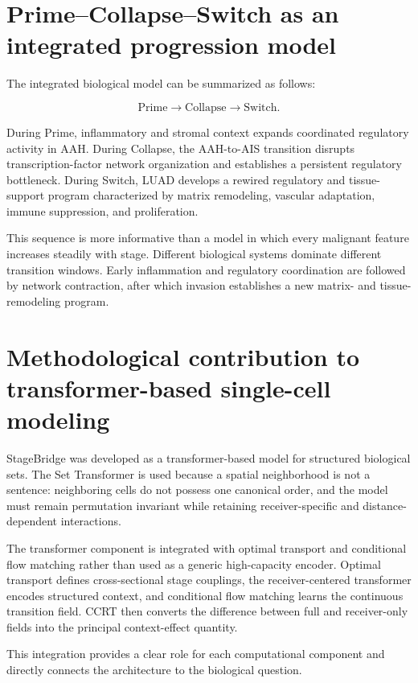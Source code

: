 \section{Prime--Collapse--Switch as an integrated progression model}

The integrated biological model can be summarized as follows:

\begin{equation}
\mathrm{Prime}
\rightarrow
\mathrm{Collapse}
\rightarrow
\mathrm{Switch}.
\end{equation}

During Prime, inflammatory and stromal context expands coordinated regulatory activity in AAH. During Collapse, the AAH-to-AIS transition disrupts transcription-factor network organization and establishes a persistent regulatory bottleneck. During Switch, LUAD develops a rewired regulatory and tissue-support program characterized by matrix remodeling, vascular adaptation, immune suppression, and proliferation.

This sequence is more informative than a model in which every malignant feature increases steadily with stage. Different biological systems dominate different transition windows. Early inflammation and regulatory coordination are followed by network contraction, after which invasion establishes a new matrix- and tissue-remodeling program.

\section{Methodological contribution to transformer-based single-cell modeling}

StageBridge was developed as a transformer-based model for structured biological sets. The Set Transformer is used because a spatial neighborhood is not a sentence: neighboring cells do not possess one canonical order, and the model must remain permutation invariant while retaining receiver-specific and distance-dependent interactions.

The transformer component is integrated with optimal transport and conditional flow matching rather than used as a generic high-capacity encoder. Optimal transport defines cross-sectional stage couplings, the receiver-centered transformer encodes structured context, and conditional flow matching learns the continuous transition field. CCRT then converts the difference between full and receiver-only fields into the principal context-effect quantity.

This integration provides a clear role for each computational component and directly connects the architecture to the biological question.

